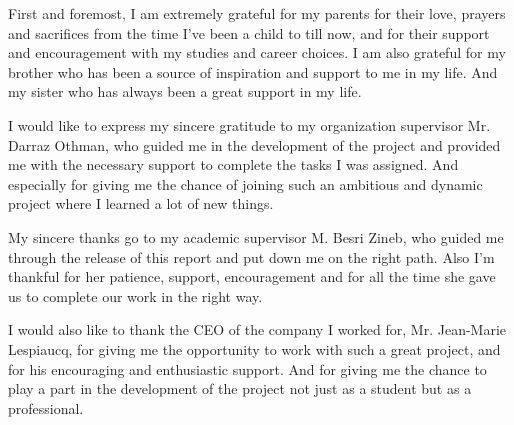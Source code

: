 First and foremost, I am extremely grateful for my parents for their love, prayers and
sacrifices from the time I've been a child to till now, and for their support and
encouragement with my studies and career choices. I am also grateful for my brother 
who has been a source of inspiration and support to me in my life. And my sister
who has always been a great support in my life.

I would like to express my sincere gratitude to my organization supervisor Mr. Darraz
Othman, who guided me in the development of the project and provided me with the necessary support to complete the tasks I was assigned. And especially for giving me the chance of
joining such an ambitious and dynamic project where I learned a lot of new things.

My sincere thanks go to my academic supervisor M. Besri Zineb, who guided me through the
release of this report and put down me on the right path. Also I'm thankful for her
patience, support, encouragement and for all the time she gave us to complete our work
in the right way.

I would also like to thank the CEO of the company I worked for, Mr. Jean-Marie Lespiaucq,
for giving me the opportunity to work with such a great project, and for his encouraging 
and enthusiastic support. And for giving me the chance to play a part in the development
of the project not just as a student but as a professional.
